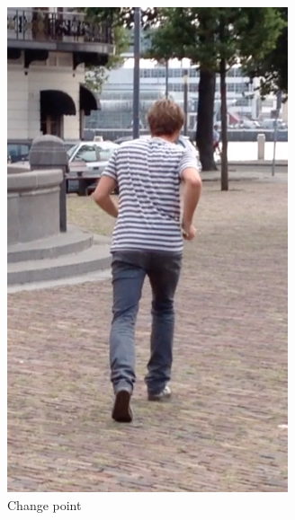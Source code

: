\begin{figure}
\begin{subfigure}[b]{0.2\textwidth}
    \includegraphics[width=\textwidth]{./Figures/chapter6/data_collection/stills/jos_cp_walk-run.png}
    \caption{Change point}
    \label{fig:stills_subject_2_change_point}
  \end{subfigure}
  \qquad \qquad \qquad
  \begin{subfigure}[b]{0.2\textwidth}

\end{subfigure}
\end{figure}
